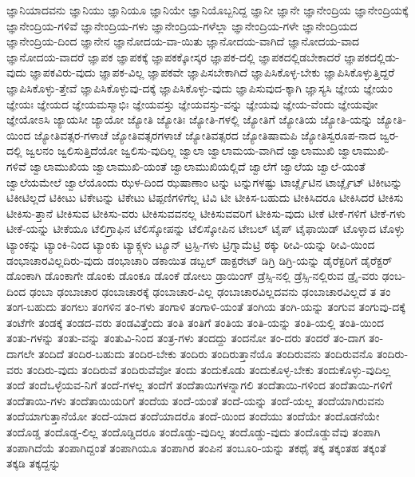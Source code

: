 {ಜ್ಞಾನಿಯಾದವನು
ಜ್ಞಾನಿಯು
ಜ್ಞಾನಿಯೂ
ಜ್ಞಾನಿಯೇ
ಜ್ಞಾನಿಯೊಬ್ಬನಿದ್ದ
ಜ್ಞಾನೀ
ಜ್ಞಾನೇ
ಜ್ಞಾನೇಂದ್ರಿಯ
ಜ್ಞಾನೇಂದ್ರಿಯಕ್ಕೆ
ಜ್ಞಾನೇಂದ್ರಿಯ-ಗಳಿವೆ
ಜ್ಞಾನೇಂದ್ರಿಯ-ಗಳು
ಜ್ಞಾನೇಂದ್ರಿಯ-ಗಳೆಲ್ಲಾ
ಜ್ಞಾನೇಂದ್ರಿಯ-ಗಳೇ
ಜ್ಞಾನೇಂದ್ರಿಯದ
ಜ್ಞಾನೇಂದ್ರಿಯ-ದಿಂದ
ಜ್ಞಾನೇನ
ಜ್ಞಾನೋದಯ-ವಾ-ಯಿತು
ಜ್ಞಾನೋದಯ-ವಾಗಿದೆ
ಜ್ಞಾನೋದಯ-ವಾದ
ಜ್ಞಾನೋದಯ-ವಾದರೆ
ಜ್ಞಾಪಕ
ಜ್ಞಾಪಕಕ್ಕೆ
ಜ್ಞಾಪಕಕ್ಕೋಸ್ಕರ
ಜ್ಞಾಪಕ-ದಲ್ಲಿ
ಜ್ಞಾಪಕದಲ್ಲಿಡಬೇಕಾದರೆ
ಜ್ಞಾಪಕದಲ್ಲಿಡು-ವುದು
ಜ್ಞಾಪಕವಿರು-ವುದು
ಜ್ಞಾಪಕ-ವಿಲ್ಲ
ಜ್ಞಾಪಕವೇ
ಜ್ಞಾಪಿಸಬೇಕಾಗಿದೆ
ಜ್ಞಾಪಿಸಿಕೊಳ್ಳ-ಬೇಕು
ಜ್ಞಾಪಿಸಿಕೊಳ್ಳುತ್ತಿದ್ದರೆ
ಜ್ಞಾಪಿಸಿಕೊಳ್ಳು-ತ್ತೇವೆ
ಜ್ಞಾಪಿಸಿಕೊಳ್ಳುವು-ದಕ್ಕೆ
ಜ್ಞಾಪಿಸಿಕೊಳ್ಳು-ವುದು
ಜ್ಞಾಪಿಸುವುದ-ಕ್ಕಾಗಿ
ಜ್ಞಾಸ್ಯಸಿ
ಜ್ಞೇಯ
ಜ್ಞೇಯಂ
ಜ್ಞೇಯಃ
ಜ್ಞೇಯದ
ಜ್ಞೇಯಮಸ್ಮಾಭಿಃ
ಜ್ಞೇಯವಸ್ತು
ಜ್ಞೇಯವಸ್ತು-ವನ್ನು
ಜ್ಞೇಯವು
ಜ್ಞೇಯ-ವೆಂದು
ಜ್ಞೇಯವೋ
ಜ್ಞೇಯೋಽಸಿ
ಜ್ಯಾಯಸೀ
ಜ್ಯಾಯೋ
ಜ್ಯೋತಿ
ಜ್ಯೋತಿಃ
ಜ್ಯೋತಿ-ಗಳಲ್ಲಿ
ಜ್ಯೋತಿಗೆ
ಜ್ಯೋತಿಯ
ಜ್ಯೋತಿ-ಯನ್ನು
ಜ್ಯೋತಿ-ಯಿಂದ
ಜ್ಯೋತಿವತ್ಸರ-ಗಳಾಚೆ
ಜ್ಯೋತಿವತ್ಸರಗಳಾಚೆ
ಜ್ಯೋತಿವತ್ಸರದ
ಜ್ಯೋತಿಷಾಮಪಿ
ಜ್ಯೋತಿಸ್ವರೂಪ-ನಾದ
ಜ್ವರ-ದಲ್ಲಿ
ಜ್ವಲನಂ
ಜ್ವಲಿಸುತ್ತಿದೆಯೋ
ಜ್ವಲಿಸು-ವುದಿಲ್ಲ
ಜ್ವಾಲಾ
ಜ್ವಾಲಾಮಯ-ವಾಗಿದೆ
ಜ್ವಾಲಾಮುಖಿ
ಜ್ವಾಲಾಮುಖಿ-ಗಳಿವೆ
ಜ್ವಾಲಾಮುಖಿಯ
ಜ್ವಾಲಾಮುಖಿ-ಯಂತೆ
ಜ್ವಾಲಾಮುಖಿಯಲ್ಲಿದೆ
ಜ್ವಾಲೆಗೆ
ಜ್ವಾಲೆಯ
ಜ್ವಾಲೆ-ಯಂತೆ
ಜ್ವಾಲೆಯಮೇಲೆ
ಜ್ವಾಲೆಯೊಂದು
ಝಳ-ದಿಂದ
ಝಷಾಣಾಂ
ಟನ್ನು
ಟನ್ನುಗಳಷ್ಟು
ಟಾರ್ಚ್ಲೈಟಿನ
ಟಾರ್ಚ್ಲೈಟ್
ಟಿಕೀಟನ್ನು
ಟಿಕೀಟಿಲ್ಲದೆ
ಟಿಕೀಟು
ಟಿಕೇಟನ್ನು
ಟಿಕೇಟು
ಟಿಪ್ಪಣಿಗಳಿಗೆಲ್ಲ
ಟಿವಿ
ಟೀ
ಟೀಕಿಸ-ಬಹುದು
ಟೀಕಿಸಿದರೂ
ಟೀಕಿಸಿದರೆ
ಟೀಕಿಸು
ಟೀಕಿಸು-ತ್ತಾನೆ
ಟೀಕಿಸುವ
ಟೀಕಿಸು-ವರು
ಟೀಕಿಸುವವನಲ್ಲ
ಟೀಕಿಸುವವರಿಗೆ
ಟೀಕಿಸು-ವುದು
ಟೀಕೆ
ಟೀಕೆ-ಗಳಿಗೆ
ಟೀಕೆ-ಗಳು
ಟೀಕೆ-ಯನ್ನು
ಟೀಕೆಯೂ
ಟೆಲಿಗ್ರಾಫಿನ
ಟೆಲಿಸ್ಕೋಪನ್ನು
ಟೆಲಿಸ್ಕೋಪಿನ
ಟೇಬಲ್
ಟೈಪ್
ಟೈಫಾಯಿಡ್
ಟೊಳ್ಳಾದ
ಟೊಳ್ಳು
ಟ್ಯಾಂಕನ್ನು
ಟ್ಯಾಂಕಿ-ನಿಂದ
ಟ್ಯಾಂಕು
ಟ್ಯಾಕ್ಸ್ಗಳು
ಟ್ಯೂನ್
ಟ್ರಸ್ಟಿ-ಗಳು
ಟ್ರಿಗ್ನಾಮೆಟ್ರಿ
ಠಕ್ಕು
ಠೀವಿ-ಯನ್ನು
ಠೀವಿ-ಯಿಂದ
ಡಂಭಾಚಾರವಿಲ್ಲದಿರು-ವುದು
ಡಂಭಾಚಾರಿ
ಡಕಾಯಿತ
ಡಬ್ಬಲ್
ಡಾಕ್ಟರೇಟ್
ಡಿಗ್ರಿ
ಡಿಗ್ರಿ-ಯನ್ನು
ಡೈರೆಕ್ಟರಿಗೆ
ಡೈರೆಕ್ಟರ್
ಡೊಂಕಾಗಿ
ಡೊಂಕಾಗೇ
ಡೊಂಕು
ಡೊಂಕೂ
ಡೊಂಕೆ
ಡೋಲು
ಡ್ರಾಯಿಂಗ್
ಡ್ರೆಸ್ಸಿ-ನಲ್ಲಿ
ಡ್ರೆಸ್ಸಿ-ನಲ್ಲಿರುವ
ಡ್ರೈ-ವರು
ಢಂಬ-ದಿಂದ
ಢಂಬಾ
ಢಂಬಾಚಾರ
ಢಂಬಾಚಾರಕ್ಕೆ
ಢಂಬಾಚಾರ-ವಿಲ್ಲ
ಢಂಬಾಚಾರವಿಲ್ಲದವನು
ಢಂಬಾಚಾರವಿಲ್ಲದೆ
ತ
ತಂ
ತಂಗ-ಬಹುದು
ತಂಗಲು
ತಂಗಳಿನ
ತಂ-ಗಳು
ತಂಗಾಳಿ
ತಂಗಾಳಿ-ಯಂತೆ
ತಂಗಿಯ
ತಂಗಿ-ಯನ್ನು
ತಂಗುವ
ತಂಗುವು-ದಕ್ಕೆ
ತಂಟೆಗೇ
ತಂಡಕ್ಕೆ
ತಂಡದ-ವರು
ತಂಡವಿತ್ತೆಂದು
ತಂತಿ
ತಂತಿಗೆ
ತಂತಿಯ
ತಂತಿ-ಯನ್ನು
ತಂತಿ-ಯಲ್ಲಿ
ತಂತಿ-ಯಿಂದ
ತಂತು-ಗಳನ್ನು
ತಂತು-ವನ್ನು
ತಂತುವಿ-ನಿಂದ
ತಂತ್ರ-ಗಳು
ತಂದದ್ದು
ತಂದನೋ
ತಂ-ದರು
ತಂದರೆ
ತಂ-ದಾಗ
ತಂ-ದಾಗಲೇ
ತಂದಿದೆ
ತಂದಿರ-ಬಹುದು
ತಂದಿರ-ಬೇಕು
ತಂದಿರು
ತಂದಿರುತ್ತಾನೆಯೊ
ತಂದಿರುವನು
ತಂದಿರುವನೊ
ತಂದಿರು-ವರು
ತಂದಿರು-ವುದು
ತಂದಿರುವೆ
ತಂದಿರುವೆವೋ
ತಂದು
ತಂದುಕೊಡು
ತಂದುಕೊಳ್ಳ-ಬೇಕು
ತಂದುಕೊಳ್ಳು-ವುದಿಲ್ಲ
ತಂದೆ
ತಂದೆಒಳ್ಳೆಯವ-ನಿಗೆ
ತಂದೆ-ಗಳಲ್ಲ
ತಂದೆಗೆ
ತಂದೆತಾಯಿಗಳನ್ನಾಗಲಿ
ತಂದೆತಾಯಿ-ಗಳಿಂದ
ತಂದೆತಾಯಿ-ಗಳಿಗೆ
ತಂದೆತಾಯಿ-ಗಳು
ತಂದೆತಾಯಿಯರಿಗೆ
ತಂದೆಯ
ತಂದೆ-ಯಂತೆ
ತಂದೆ-ಯನ್ನು
ತಂದೆ-ಯಲ್ಲ
ತಂದೆಯಾಗಿರುವನು
ತಂದೆಯಾಗುತ್ತಾನೆಯೋ
ತಂದೆ-ಯಾದ
ತಂದೆಯಾದರೊ
ತಂದೆ-ಯಿಂದ
ತಂದೆಯು
ತಂದೆಯೇ
ತಂದೊಡನೆಯೇ
ತಂದೊಡ್ಡ
ತಂದೊಡ್ಡ-ಲಿಲ್ಲ
ತಂದೊಡ್ಡಿದರೂ
ತಂದೊಡ್ಡು-ವುದಿಲ್ಲ
ತಂದೊಡ್ಡು-ವುದು
ತಂದೊಡ್ಡುವೆವು
ತಂಪಾಗಿ
ತಂಪಾಗಿದೆಯೆ
ತಂಪಾಗಿದ್ದಂತೆ
ತಂಪಾಗಿಯೂ
ತಂಪಾಗಿರ
ತಂಪಿನ
ತಂಬೂರಿ-ಯನ್ನು
ತಕಥೈ
ತಕ್ಕ
ತಕ್ಕಂತಹ
ತಕ್ಕಂತೆ
ತಕ್ಕಡಿ
ತಕ್ಕದ್ದನ್ನು
}
